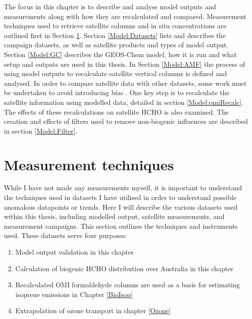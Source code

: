   The focus in this chapter is to describe and analyse model outputs and measurements along with how they are recalculated and compared.
  Measurement techniques used to retrieve satellite columns and in situ concentrations are outlined first in Section \ref{Model:Meas}.
  Section \ref{Model:Datasets} lists and describes the campaign datasets, as well as satellite products and types of model output.
  Section \ref{Model:GC} describes the GEOS-Chem model, how it is run and what setup and outputs are used in this thesis.
  In Section \ref{Model:AMF} the process of using model outputs to recalculate satellite vertical columns is defined and analysed.
  In order to compare satellite data with other datasets, some work must be undertaken to avoid introducing bias \parencite[eg.][]{Palmer2001, Eskes2003, Marais2012, Lamsal2014}.
  One key step is to recalculate the satellite information using modelled data, detailed in section \ref{Model:omiRecalc}.
  The effects of these recalculations on satellite HCHO is also examined.
  The creation and effects of filters used to remove non-biogenic influences are described in section \ref{Model:Filter}.
  

\section{Measurement techniques}
  \label{Model:Meas}
  
  While I have not made any measurements myself, it is important to understand the techniques used in datasets I have utilised in order to understand possible anomalous datapoints or trends.
  Here I will describe the various datasets used within this thesis, including modelled output, satellite measurements, and measurement campaigns.
  This section outlines the techniques and instruments used.
  These datasets serve four purposes: 
  \begin{enumerate}
    \item Model output validation in this chapter
    \item Calculation of biogenic HCHO distribution over Australia in this chapter
    \item Recalculated OMI formaldehyde columns are used as a basis for estimating isoprene emissions in Chapter \ref{BioIsop}
    \item Extrapolation of ozone transport in chapter \ref{Ozone}
  \end{enumerate}
  
